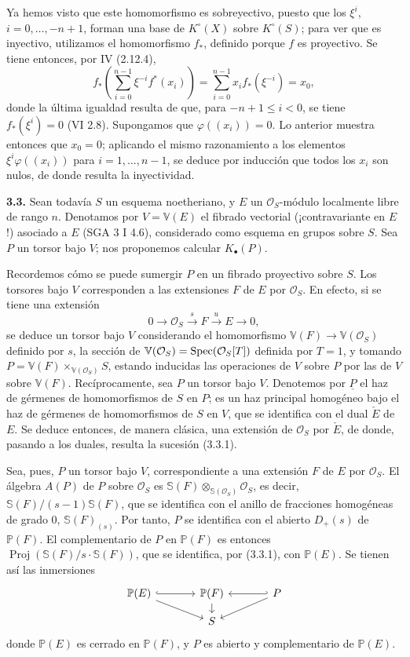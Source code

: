 Ya hemos visto que este homomorfismo es sobreyectivo, puesto que los $\xi^i$, $i=0,\ldots,-n+1$, forman una base de $K^\circ(X)$ sobre $K^\circ(S)$; para ver que es inyectivo, utilizamos el homomorfismo $f_*$, definido porque $f$ es proyectivo. Se tiene entonces, por IV (2.12.4),
\[
f_*\left(\sum_{i=0}^{n-1}\xi^{-i}f^*(x_i)\right)
=\sum_{i=0}^{n-1}x_i f_*(\xi^{-i})=x_0,
\]
donde la última igualdad resulta de que, para $-n+1\le i<0$, se tiene $f_*(\xi^i)=0$ (VI 2.8). Supongamos que $\varphi((x_i))=0$. Lo anterior muestra entonces que $x_0=0$; aplicando el mismo razonamiento a los elementos $\xi^i\varphi((x_i))$ para $i=1,\ldots,n-1$, se deduce por inducción que todos los $x_i$ son nulos, de donde resulta la inyectividad.

\textbf{3.3.} Sean todavía $S$ un esquema noetheriano, y $E$ un $\mathcal O_S$-módulo localmente libre de rango $n$. Denotamos por $V=\mathbb V(E)$ el fibrado vectorial (¡contravariante en $E$!) asociado a $E$ (SGA 3 I 4.6), considerado como esquema en grupos sobre $S$. Sea $P$ un torsor bajo $V$; nos proponemos calcular $K_\bullet(P)$.

Recordemos cómo se puede sumergir $P$ en un fibrado proyectivo sobre $S$. Los torsores bajo $V$ corresponden a las extensiones $F$ de $E$ por $\mathcal O_S$. En efecto, si se tiene una extensión
\[
0\longrightarrow \mathcal O_S\xrightarrow{s}F\xrightarrow{u}E\longrightarrow 0,
\tag{3.3.1}
\]
se deduce un torsor bajo $V$ considerando el homomorfismo $\mathbb V(F)\to \mathbb V(\mathcal O_S)$ definido por $s$, la sección de $\mathbb V(\mathcal O_S)=\operatorname{Spec}(\mathcal O_S[T])$ definida por $T=1$, y tomando $P=\mathbb V(F)\times_{\mathbb V(\mathcal O_S)}S$, estando inducidas las operaciones de $V$ sobre $P$ por las de $V$ sobre $\mathbb V(F)$.
Recíprocamente, sea $P$ un torsor bajo $V$. Denotemos por $\underline P$ el haz de gérmenes de homomorfismos de $S$ en $P$; es un haz principal homogéneo bajo el haz de gérmenes de homomorfismos de $S$ en $V$, que se identifica con el dual $\check E$ de $E$. Se deduce entonces, de manera clásica, una extensión de $\mathcal O_S$ por $\check E$, de donde, pasando a los duales, resulta la sucesión (3.3.1).

Sea, pues, $P$ un torsor bajo $V$, correspondiente a una extensión $F$ de $E$ por $\mathcal O_S$. El álgebra $A(P)$ de $P$ sobre $\mathcal O_S$ es $\mathbb S(F)\otimes_{\mathbb S(\mathcal O_S)}\mathcal O_S$, es decir, $\mathbb S(F)/(s-1)\mathbb S(F)$, que se identifica con el anillo de fracciones homogéneas de grado $0$, $\mathbb S(F)_{(s)}$. Por tanto, $P$ se identifica con el abierto $D_+(s)$ de $\mathbb P(F)$. El complementario de $P$ en $\mathbb P(F)$ es entonces $\operatorname{Proj}(\mathbb S(F)/s\cdot \mathbb S(F))$, que se identifica, por (3.3.1), con $\mathbb P(E)$. Se tienen así las inmersiones
\[
\begin{tikzcd}[column sep=large,row sep=small]
\mathbb P(E) \arrow[r,hook] \arrow[dr] & \mathbb P(F) \arrow[d] & P \arrow[l,hook'] \arrow[dl]\\
& S &
\end{tikzcd}
\]
donde $\mathbb P(E)$ es cerrado en $\mathbb P(F)$, y $P$ es abierto y complementario de $\mathbb P(E)$.

